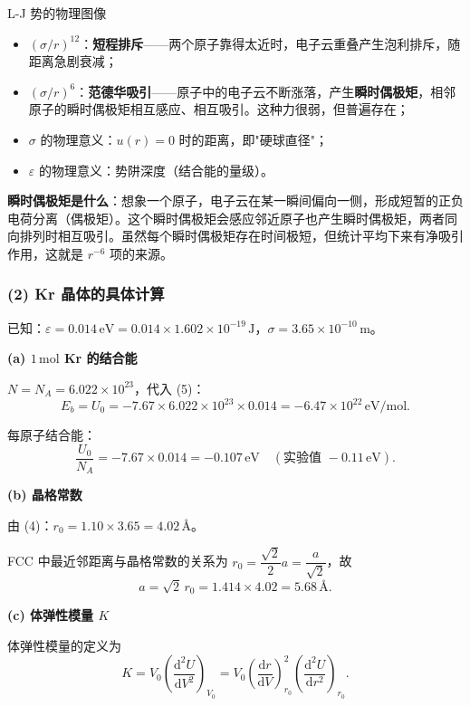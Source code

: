 \begin{insightbox}{L-J 势的物理图像}
\begin{itemize}[nosep]
  \item $(\sigma/r)^{12}$：\textbf{短程排斥}——两个原子靠得太近时，电子云重叠产生泡利排斥，随距离急剧衰减；
  \item $(\sigma/r)^{6}$：\textbf{范德华吸引}——原子中的电子云不断涨落，产生\textbf{瞬时偶极矩}，相邻原子的瞬时偶极矩相互感应、相互吸引。这种力很弱，但普遍存在；
  \item $\sigma$ 的物理意义：$u(r)=0$ 时的距离，即"硬球直径"；
  \item $\varepsilon$ 的物理意义：势阱深度（结合能的量级）。
\end{itemize}

\textbf{瞬时偶极矩是什么}：想象一个原子，电子云在某一瞬间偏向一侧，形成短暂的正负电荷分离（偶极矩）。这个瞬时偶极矩会感应邻近原子也产生瞬时偶极矩，两者同向排列时相互吸引。虽然每个瞬时偶极矩存在时间极短，但统计平均下来有净吸引作用，这就是 $r^{-6}$ 项的来源。
\end{insightbox}


\subsubsection{(2) Kr 晶体的具体计算}

已知：$\varepsilon = 0.014\,\text{eV} = 0.014\times 1.602\times 10^{-19}\,\text{J}$，$\sigma = 3.65\times 10^{-10}\,\text{m}$。

\vspace{0.5em}
\textbf{(a) $1\,\text{mol}$ Kr 的结合能}

$N = N_A = 6.022\times 10^{23}$，代入 (5)：
\[
  E_b = U_0 = -7.67\times 6.022\times 10^{23}\times 0.014
       = -6.47\times 10^{22}\,\text{eV/mol} .
\]

每原子结合能：
\[
  \frac{U_0}{N_A} = -7.67\times 0.014 = -0.107\,\text{eV}
  \quad (\text{实验值 } -0.11\,\text{eV}) .
\]

\textbf{(b) 晶格常数}

由 (4)：$r_0 = 1.10\times 3.65 = 4.02\,\text{\AA}$。

FCC 中最近邻距离与晶格常数的关系为 $r_0 = \dfrac{\sqrt{2}}{2}a = \dfrac{a}{\sqrt{2}}$，故
\[
  a = \sqrt{2}\,r_0 = 1.414\times 4.02 = \boxed{5.68\,\text{\AA}} .
\]

\textbf{(c) 体弹性模量 $K$}

体弹性模量的定义为
\[
  K = V_0\left(\frac{\mathrm{d}^2 U}{\mathrm{d} V^2}\right)_{V_0}
    = V_0\left(\frac{\mathrm{d}r}{\mathrm{d}V}\right)_{r_0}^{\!2}\left(\frac{\mathrm{d}^2 U}{\mathrm{d}r^2}\right)_{r_0} .
\tag{6}
\]

